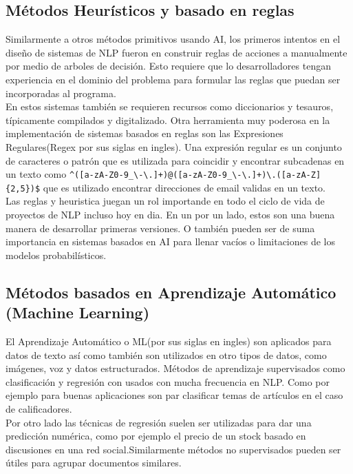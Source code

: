 \subsection{Métodos Heurísticos y basado en reglas}

Similarmente a otros métodos primitivos usando AI, los primeros intentos en el diseño de sistemas de NLP fueron
en construir reglas de acciones a manualmente por medio de arboles de decisión. Esto requiere que lo desarrolladores tengan
experiencia en el dominio 
del problema para formular las reglas que puedan ser incorporadas al programa.\\
En estos sistemas también se requieren recursos como diccionarios y tesauros, típicamente compilados y digitalizado. Otra 
herramienta muy poderosa en la implementación de sistemas basados en reglas son las Expresiones Regulares(Regex por sus
siglas en ingles). Una expresión regular es un conjunto de caracteres o patrón que es utilizada para coincidir y
encontrar subcadenas en un texto como  
\verb|^([a-zA-Z0-9_\-\.]+)@([a-zA-Z0-9_\-\.]+)\.([a-zA-Z]{2,5})$|
que es utilizado encontrar direcciones de email validas en un texto.\\
Las reglas y heuristica juegan un rol importande en todo el ciclo de vida de proyectos de NLP incluso hoy en dia. En un 
por un lado, estos son una buena manera de desarrollar primeras versiones. O también pueden ser de suma importancia en 
sistemas basados en AI para llenar vacíos o limitaciones de los modelos probabilísticos.
\cite{sowmya_practical_npl}

\subsection{Métodos basados en Aprendizaje Automático (Machine Learning)}
El Aprendizaje Automático o ML(por sus siglas en ingles) son aplicados para datos de texto así como también son utilizados
en otro tipos de datos, como imágenes, voz y datos estructurados. Métodos de aprendizaje supervisados como clasificación y 
regresión con usados con mucha frecuencia en NLP. Como por ejemplo para buenas aplicaciones son par clasificar temas de 
artículos en el caso de calificadores.\\
Por otro lado las técnicas de regresión suelen ser utilizadas para dar una predicción numérica, como por ejemplo el precio
de un stock basado en discusiones en una red social.Similarmente métodos no supervisados pueden ser útiles para
agrupar documentos similares.
